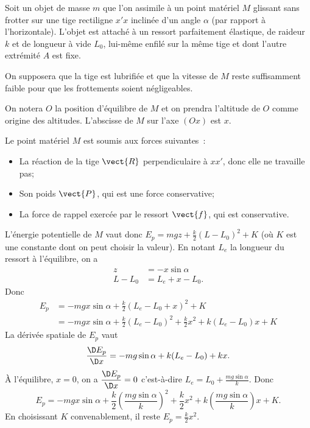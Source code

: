 Soit un objet de masse $m$ que l'on assimile à un point matériel $M$ glissant sans frotter sur une tige rectiligne $x'x$ inclinée d'un angle $\alpha$ (par rapport à l'horizontale). L'objet est attaché à un ressort parfaitement élastique, de raideur $k$ et de longueur à vide $L_0$, lui-même enfilé sur la même tige et dont l'autre extrémité $A$ est fixe.

On supposera que la tige est lubrifiée et que la vitesse de $M$ reste suffisamment faible pour que les frottements soient négligeables.

On notera $O$ la position d'équilibre de $M$ et on prendra l'altitude de $O$ comme origine des altitudes. L'abscisse de $M$ sur l'axe $(Ox)$ est $x$.

Le point matériel $M$ est soumis aux forces suivantes~:
\begin{itemize}
\item La réaction de la tige $\vect{R}$ perpendiculaire à $xx'$, donc elle ne travaille pas;
\item Son poids $\vect{P}$, qui est une force conservative;
\item La force de rappel exercée par le ressort $\vect{f}$, qui est conservative.
\end{itemize}

L'énergie potentielle de $M$ vaut donc $E_p = mgz + \frac{k}{2}(L-L_0)^2 +K$ (où $K$ est une constante dont on peut choisir la valeur). En notant $L_e$ la longueur du ressort à l'équilibre, on a
\begin{align}
  z &= -x \sin \alpha \\
  L-L_0 &= L_e+x-L_0.
\end{align}
Donc
\begin{align}
  E_p &= -mgx \sin \alpha + \frac{k}{2}(L_e-L_0+x)^2 +K \\
  &= -mgx \sin \alpha + \frac{k}{2}(L_e-L_0)^2 +\frac{k}{2}x^2 + k(L_e-L_0)x+K 
\end{align}
La dérivée spatiale de $E_p$ vaut
\begin{equation}
  \derived{E_p}{x} = -mg\sin\alpha + k(L_e-L_0) + kx.
\end{equation}
À l'équilibre, $x=0$, on a $\derived{E_p}{x}=0$ c'est-à-dire $L_e = L_0 + \frac{mg\sin\alpha}{k}$. Donc
\begin{equation}
  E_p = -mgx \sin \alpha + \frac{k}{2}\left(\frac{mg\sin\alpha}{k}\right)^2 +\frac{k}{2}x^2 + k\left(\frac{mg\sin\alpha}{k}\right)x+K.
\end{equation}
En choisissant $K$ convenablement, il reste $E_p = \frac{k}{2}x^2$.

